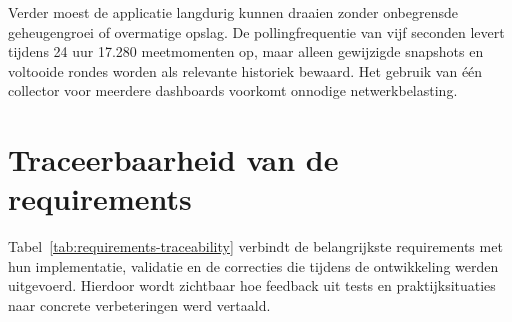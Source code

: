 Verder moest de applicatie langdurig kunnen draaien zonder onbegrensde geheugengroei of overmatige
opslag. De pollingfrequentie van vijf seconden levert tijdens 24 uur 17.280 meetmomenten op, maar
alleen gewijzigde snapshots en voltooide rondes worden als relevante historiek bewaard. Het gebruik
van één collector voor meerdere dashboards voorkomt onnodige netwerkbelasting.


\iffalse
\section{Traceerbaarheid van de requirements}

Tabel~\ref{tab:requirements-traceability} verbindt de belangrijkste requirements met hun implementatie, validatie en de correcties die tijdens de ontwikkeling werden uitgevoerd. Hierdoor wordt zichtbaar hoe feedback uit tests en praktijksituaties naar concrete verbeteringen werd vertaald.

